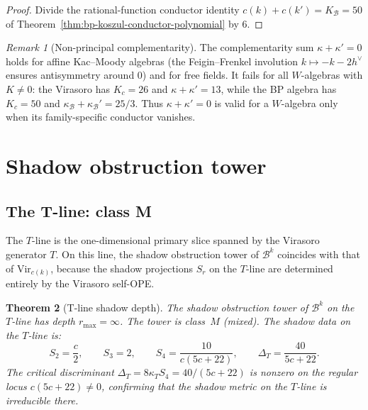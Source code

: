 \documentclass[11pt]{article}
\theoremstyle{plain}
\newtheorem{theorem}{Theorem}[section]
\theoremstyle{definition}
\theoremstyle{remark}
\newtheorem{remark}[theorem]{Remark}
\newcommand{\cB}{\mathcal{B}}
\newcommand{\Vir}{\mathrm{Vir}}
\numberwithin{equation}{section}
\begin{document}
\begin{proof}
Divide the rational-function conductor identity
$c(k)+c(k')=K_{\cB}=50$ of
Theorem~\ref{thm:bp-koszul-conductor-polynomial} by $6$.
\end{proof}

\begin{remark}[Non-principal complementarity]\label{rem:bp-nonprincipal-complementarity}
The complementarity sum $\kappa + \kappa' = 0$ holds for affine
Kac--Moody algebras (the Feigin--Frenkel involution $k \mapsto
-k - 2h^\vee$ ensures antisymmetry around $0$) and for free fields.
It fails for all $W$-algebras with $K \neq 0$: the Virasoro has
$K_c = 26$ and $\kappa+\kappa'=13$, while the BP algebra has
$K_c = 50$ and $\kappa_{\cB}+\kappa_{\cB}'=25/3$. Thus
$\kappa+\kappa'=0$ is valid for a $W$-algebra only when its
family-specific conductor vanishes.
\end{remark}

\section{Shadow obstruction tower}\label{sec:shadow}

\subsection{The T-line: class M}

The $T$-line is the one-dimensional primary slice spanned by the
Virasoro generator $T$. On this line, the shadow obstruction tower
of $\cB^k$ coincides with that of $\Vir_{c(k)}$, because the shadow
projections $S_r$ on the $T$-line are determined entirely by the
Virasoro self-OPE.

\begin{theorem}[T-line shadow depth]\label{thm:t-line-depth}
The shadow obstruction tower of $\cB^k$ on the $T$-line has depth
$r_{\max} = \infty$. The tower is class~$M$ (mixed). The shadow
data on the $T$-line is:
\begin{equation}\label{eq:t-line-shadows}
 S_2 = \frac{c}{2},
 \qquad
 S_3 = 2,
 \qquad
 S_4 = \frac{10}{c(5c+22)},
 \qquad
 \Delta_T = \frac{40}{5c+22}.
\end{equation}
The critical discriminant $\Delta_T = 8 \kappa_T S_4 = 40/(5c+22)$ is
nonzero on the regular locus $c(5c+22)\ne0$, confirming that the
shadow metric on the $T$-line is irreducible there.
\end{theorem}
\end{document}
